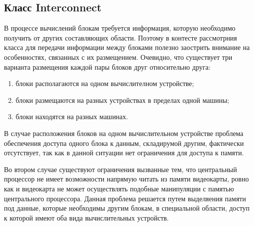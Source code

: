 \documentclass[a4paper, 14pt]{article}
\theoremstyle{definition}
\begin{document}
\newpage
\subsection{Класс Interconnect}

\par В процессе вычислений блокам требуется информация, которую необходимо получить от других составляющих области. Поэтому в контесте рассмотрния класса для передачи информации между блоками полезно заострить внимание на особенностях, связанных с их размещением. Очевидно, что существует три варианта размещения каждой пары блоков друг относительно друга:
\begin{enumerate}
\item блоки располагаются на одном вычислителном устройстве;
\item блоки размещаются на разных устройствах в пределах одной машины;
\item блоки находятся на разных машинах.
\end{enumerate}

\par В случае расположения блоков на одном вычислительном устройстве проблема обеспечения доступа одного блока к данным, складирумой другим, фактически отсутствует, так как в данной ситуации нет ограничения для доступа к памяти.

\par Во втором случае существуют ограничения вызванные тем, что центральный процессор не имеет возможности напрямую читать из памяти видеокарты, ровно как и видеокарта не может осуществлять подобные манипуляции с памятью центрального процессора. Данная проблема решается путем выделяения памяти под данные, которые необходимы другим блокам, в специальной области, доступ к которой имеют оба вида вычислительных устройств.
\end{document}
